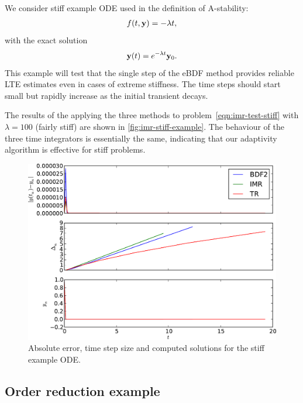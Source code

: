 We consider stiff example ODE used in the definition of A-stability:
\begin{equation}
  \label{eqn:imr-test-stiff}
  \begin{aligned}
    f(t, \mathbf{y}) = -\lambda t, \\
  \end{aligned}
\end{equation}
with the exact solution
\begin{equation}
  \label{eqn:imr-test-stiff-exact}
  \mathbf{y}(t) = e^{-\lambda t} \mathbf{y}_0. \\
\end{equation} 
This example will test that the single step of the eBDF method provides reliable LTE estimates even in cases of extreme stiffness.
The time steps should start small but rapidly increase as the initial transient decays.

The results of the applying the three methods to problem~\eqref{eqn:imr-test-stiff} with $\lambda = 100$ (fairly stiff) are shown in \autoref{fig:imr-stiff-example}.
The behaviour of the three time integrators is essentially the same, indicating that our adaptivity algorithm is effective for stiff problems.

\begin{figure}[\figpos]
  \centering
  \includegraphics[width=1\textwidth]{plots/aimr_odes/simple_stiff-errornormsvs-dtsvs-tracevaluesvstimes}
  \caption{Absolute error, time step size and computed solutions for the stiff example ODE.}
  \label{fig:imr-stiff-example}
\end{figure}


\subsection{Order reduction example}
\label{sec:order-reduct-example}

